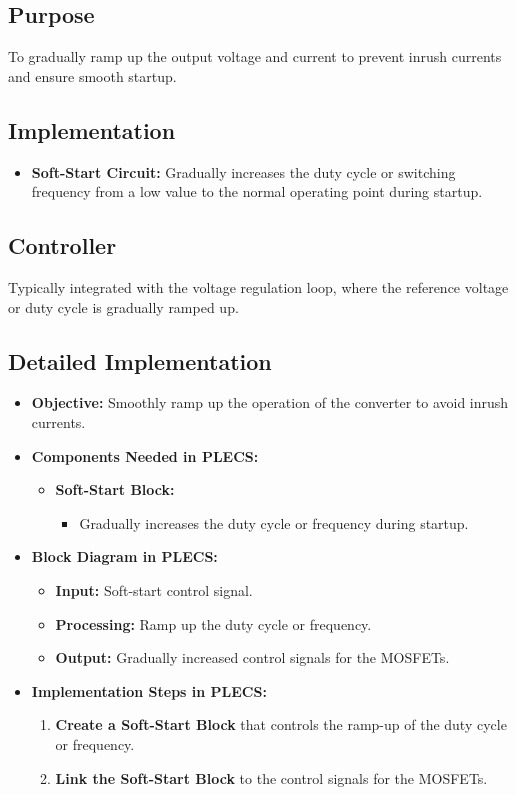 \documentclass{article}
\begin{document}
\subsection{Purpose}
To gradually ramp up the output voltage and current to prevent inrush currents and ensure smooth startup.

\subsection{Implementation}
\begin{itemize}
    \item \textbf{Soft-Start Circuit:} Gradually increases the duty cycle or switching frequency from a low value to the normal operating point during startup.
\end{itemize}

\subsection{Controller}
Typically integrated with the voltage regulation loop, where the reference voltage or duty cycle is gradually ramped up.

\subsection{Detailed Implementation}
\begin{itemize}
    \item \textbf{Objective:} Smoothly ramp up the operation of the converter to avoid inrush currents.
    \item \textbf{Components Needed in PLECS:}
    \begin{itemize}
        \item \textbf{Soft-Start Block:}
        \begin{itemize}
            \item Gradually increases the duty cycle or frequency during startup.
        \end{itemize}
    \end{itemize}
    \item \textbf{Block Diagram in PLECS:}
    \begin{itemize}
        \item \textbf{Input:} Soft-start control signal.
        \item \textbf{Processing:} Ramp up the duty cycle or frequency.
        \item \textbf{Output:} Gradually increased control signals for the MOSFETs.
    \end{itemize}
    \item \textbf{Implementation Steps in PLECS:}
    \begin{enumerate}
        \item \textbf{Create a Soft-Start Block} that controls the ramp-up of the duty cycle or frequency.
        \item \textbf{Link the Soft-Start Block} to the control signals for the MOSFETs.
    \end{enumerate}
\end{itemize}
\end{document}
